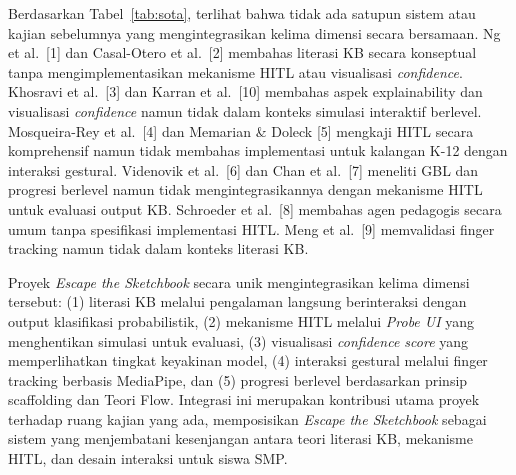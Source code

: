 Berdasarkan Tabel~\ref{tab:sota}, terlihat bahwa tidak ada satupun sistem atau kajian sebelumnya yang mengintegrasikan kelima dimensi secara bersamaan. Ng et al.\ [1] dan Casal-Otero et al.\ [2] membahas literasi KB secara konseptual tanpa mengimplementasikan mekanisme HITL atau visualisasi \textit{confidence}. Khosravi et al.\ [3] dan Karran et al.\ [10] membahas aspek explainability dan visualisasi \textit{confidence} namun tidak dalam konteks simulasi interaktif berlevel. Mosqueira-Rey et al.\ [4] dan Memarian \& Doleck [5] mengkaji HITL secara komprehensif namun tidak membahas implementasi untuk kalangan K-12 dengan interaksi gestural. Videnovik et al.\ [6] dan Chan et al.\ [7] meneliti GBL dan progresi berlevel namun tidak mengintegrasikannya dengan mekanisme HITL untuk evaluasi output KB. Schroeder et al.\ [8] membahas agen pedagogis secara umum tanpa spesifikasi implementasi HITL. Meng et al.\ [9] memvalidasi finger tracking namun tidak dalam konteks literasi KB.

Proyek \textit{Escape the Sketchbook} secara unik mengintegrasikan kelima dimensi tersebut: (1) literasi KB melalui pengalaman langsung berinteraksi dengan output klasifikasi probabilistik, (2) mekanisme HITL melalui \textit{Probe UI} yang menghentikan simulasi untuk evaluasi, (3) visualisasi \textit{confidence score} yang memperlihatkan tingkat keyakinan model, (4) interaksi gestural melalui finger tracking berbasis MediaPipe, dan (5) progresi berlevel berdasarkan prinsip scaffolding dan Teori Flow. Integrasi ini merupakan kontribusi utama proyek terhadap ruang kajian yang ada, memposisikan \textit{Escape the Sketchbook} sebagai sistem yang menjembatani kesenjangan antara teori literasi KB, mekanisme HITL, dan desain interaksi untuk siswa SMP.


